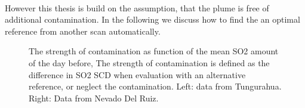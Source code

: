 \\
However this thesis is build on the assumption, that the plume is free of additional contamination. In the following we discuss how to find the an optimal reference from another scan automatically.
\begin{figure}
	\caption{The strength of contamination as function of the mean SO2 amount of the day before, The strength of contamination is defined as the difference in SO2 SCD  when evaluation with an alternative reference, or neglect the contamination. Left: data from Tungurahua. Right: Data from Nevado Del Ruiz. }
	\label{fig:contaminationdependencyso2}
\end{figure}